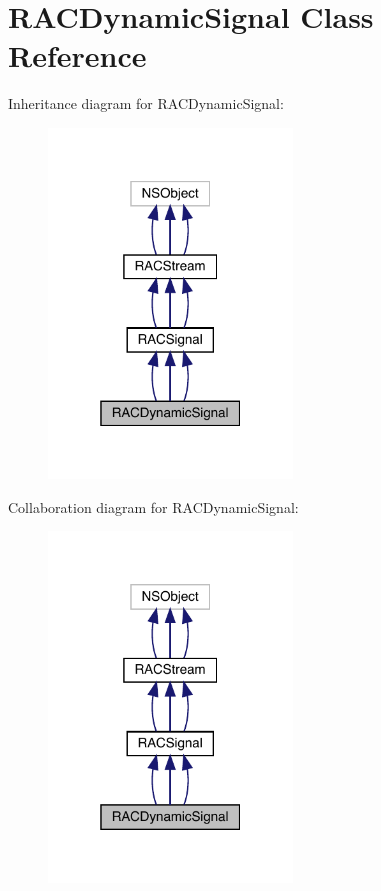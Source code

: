 \hypertarget{interface_r_a_c_dynamic_signal}{}\section{R\+A\+C\+Dynamic\+Signal Class Reference}
\label{interface_r_a_c_dynamic_signal}


Inheritance diagram for R\+A\+C\+Dynamic\+Signal\+:\nopagebreak
\begin{figure}[H]
\begin{center}
\leavevmode
\includegraphics[width=184pt]{interface_r_a_c_dynamic_signal__inherit__graph}
\end{center}
\end{figure}


Collaboration diagram for R\+A\+C\+Dynamic\+Signal\+:\nopagebreak
\begin{figure}[H]
\begin{center}
\leavevmode
\includegraphics[width=184pt]{interface_r_a_c_dynamic_signal__coll__graph}
\end{center}
\end{figure}

